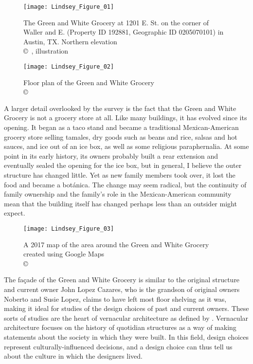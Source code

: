 \begin{figure}[!p]
\begin{minipage}[t]{.49\linewidth}
	\texttt{[image: Lindsey\_Figure\_01]}
	\caption{The Green and White Grocery at 1201 E.  St. on the corner of Waller and E. 
(Property ID 192881, Geographic ID 0205070101)
in Austin, TX. Northern elevation\\
		{\normalfont\scriptsize \copyright\
			\shortauthor, illustration
	}}
	\label{fig:Lindsey_Figure_01}
\end{minipage}
\hfill
\begin{minipage}[t]{.49\linewidth}
	\texttt{[image: Lindsey\_Figure\_02]}
	\caption{Floor plan of the Green and White Grocery\\
		{\normalfont\scriptsize \copyright\
			\shortauthor
	}}
	\label{fig:Lindsey_Figure_02}
\end{minipage}
\end{figure}

A larger detail overlooked by the survey is the fact that the Green and White Grocery is not a grocery store at all. Like many buildings, it has evolved since its opening. It began as a taco stand and became a traditional Mexican-American grocery store selling tamales, dry goods such as beans and rice, salsas and hot sauces, and ice out of an ice box, as well as some religious paraphernalia. At some point in its early history, its owners probably built a rear extension and eventually sealed the opening for the ice box, but in general, I believe the outer structure has changed little. Yet as new family members took over, it lost the food and became a botánica. The change may seem radical, but the continuity of family ownership and the family’s role in the Mexican-American community mean that the building itself has changed perhaps less than an outsider might expect.

\begin{figure}[!p]
	\texttt{[image: Lindsey\_Figure\_03]}
	\caption{A 2017 map of the area around the Green and White Grocery created using Google Maps \\
		{\normalfont\scriptsize \copyright\ \textcite{googlemaps}
	}}
	\label{fig:Lindsey_Figure_03}
\end{figure}

The façade of the Green and White Grocery is similar to the original structure and current owner John Lopez Cazares, who is the grandson of original owners Noberto and Susie Lopez, claims to have left most floor shelving as it was, making it ideal for studies of the design choices of past and current owners. These sorts of studies are the heart of vernacular architecture as defined by \textcite{glassie}. Vernacular architecture focuses on the history of quotidian structures as a way of making statements about the society in which they were built. In this field, design choices represent culturally-influenced decisions, and a design choice can thus tell us about the culture in which the designers lived.


